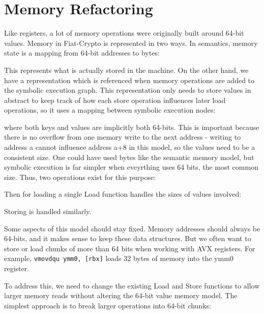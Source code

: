 \chapter{Memory Refactoring}
\label{ch:memory}

Like registers, a lot of memory operations were originally built around 64-bit values. Memory in Fiat-Crypto is represented in two ways. In semantics, memory state is a mapping from 64-bit addresses to bytes:


This represents what is actually stored in the machine. On the other hand, we have a representation which is referenced when memory operations are added to the symbolic execution graph. This representation only needs to store values in abstract to keep track of how each store operation influences later load operations, so it uses a mapping between symbolic execution nodes:


where both keys and values are implicitly both 64-bits. This is important because there is no overflow from one memory write to the next address - writing to address a cannot influence address a+8 in this model, so the values need to be a consistent size. One could have used bytes like the semantic memory model, but symbolic execution is far simpler when eveyrthing uses 64 bits, the most common size. Thus, two operations exist for this purpose:

\vspace{-5ex}

Then for loading a single Load function handles the sizes of values involved:


Storing is handled similarly.

Some aspects of this model should stay fixed. Memory addresses should always be 64-bits, and it makes sense to keep these data structures. But we often want to store or load chunks of more than 64 bits when working with AVX registers. For example, \texttt{vmovdqu ymm0, [rbx]} loads 32 bytes of memory into the ymm0 register.

To address this, we need to change the existing Load and Store functions to allow larger memory reads without altering the 64-bit value memory model. The simplest approach is to break larger operations into 64-bit chunks:

\vspace{-5ex}

